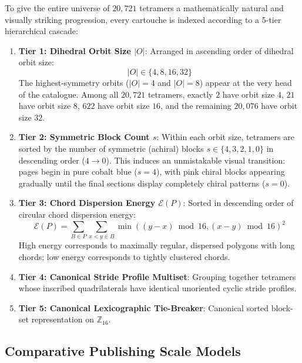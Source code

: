To give the entire universe of $20{,}721$ tetramers a mathematically natural and visually striking progression, every cartouche is indexed according to a 5-tier hierarchical cascade:
\begin{enumerate}
    \item \textbf{Tier 1: Dihedral Orbit Size $|O|$}:
    Arranged in ascending order of dihedral orbit size:
    \[
    |O| \in \{4, 8, 16, 32\}
    \]
    The highest-symmetry orbits ($|O| = 4$ and $|O| = 8$) appear at the very head of the catalogue. Among all $20{,}721$ tetramers, exactly $2$ have orbit size $4$, $21$ have orbit size $8$, $622$ have orbit size $16$, and the remaining $20{,}076$ have orbit size $32$.
    
    \item \textbf{Tier 2: Symmetric Block Count $s$}:
    Within each orbit size, tetramers are sorted by the number of symmetric (achiral) blocks $s \in \{4, 3, 2, 1, 0\}$ in descending order ($4 \to 0$). This induces an unmistakable visual transition: pages begin in pure cobalt blue ($s = 4$), with pink chiral blocks appearing gradually until the final sections display completely chiral patterns ($s = 0$).
    
    \item \textbf{Tier 3: Chord Dispersion Energy $\mathcal{E}(P)$}:
    Sorted in descending order of circular chord dispersion energy:
    \[
    \mathcal{E}(P) = \sum_{B \in P} \sum_{x < y \in B} \min((y - x) \bmod 16, (x - y) \bmod 16)^2
    \]
    High energy corresponds to maximally regular, dispersed polygons with long chords; low energy corresponds to tightly clustered chords.
    
    \item \textbf{Tier 4: Canonical Stride Profile Multiset}:
    Grouping together tetramers whose inscribed quadrilaterals have identical unoriented cyclic stride profiles.
    
    \item \textbf{Tier 5: Canonical Lexicographic Tie-Breaker}:
    Canonical sorted block-set representation on $\mathbb{Z}_{16}$.
\end{enumerate}

\subsection{Comparative Publishing Scale Models}

